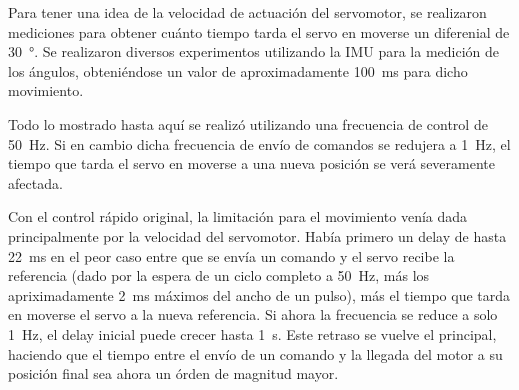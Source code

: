 Para tener una idea de la velocidad de actuación del servomotor, se realizaron mediciones para obtener cuánto tiempo tarda el servo en moverse un diferenial de \qty{30}{\degree}. Se realizaron diversos experimentos utilizando la IMU para la medición de los ángulos, obteniéndose un valor de aproximadamente \qty{100}{\ms} para dicho movimiento.

Todo lo mostrado hasta aquí se realizó utilizando una frecuencia de control de \qty{50}{\Hz}. Si en cambio dicha frecuencia de envío de comandos se redujera a \qty{1}{\Hz}, el tiempo que tarda el servo en moverse a una nueva posición se verá severamente afectada.

Con el control rápido original, la limitación para el movimiento venía dada principalmente por la velocidad del servomotor. Había primero un delay de hasta \qty{22}{\ms} en el peor caso entre que se envía un comando y el servo recibe la referencia (dado por la espera de un ciclo completo a \qty{50}{\Hz}, más los apriximadamente \qty{2}{\ms} máximos del ancho de un pulso), más el tiempo que tarda en moverse el servo a la nueva referencia. Si ahora la frecuencia se reduce a solo \qty{1}{\Hz}, el delay inicial puede crecer hasta \qty{1}{\s}. Este retraso se vuelve el principal, haciendo que el tiempo entre el envío de un comando y la llegada del motor a su posición final sea ahora un órden de magnitud mayor.

